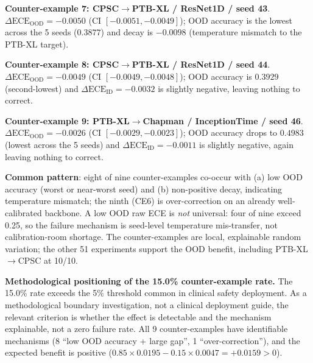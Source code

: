 \documentclass[review,12pt,nonatbib]{elsarticle}
\begin{document}
\textbf{Counter-example 7: CPSC$\rightarrow$PTB-XL / ResNet1D / seed 43}.
$\Delta\text{ECE}_{\text{OOD}}=-0.0050$ (CI $[-0.0051, -0.0049]$); OOD
accuracy is the lowest across the 5 seeds ($0.3877$) and decay is
$-0.0098$ (temperature mismatch to the PTB-XL target).

\textbf{Counter-example 8: CPSC$\rightarrow$PTB-XL / ResNet1D / seed 44}.
$\Delta\text{ECE}_{\text{OOD}}=-0.0049$ (CI $[-0.0049, -0.0048]$); OOD
accuracy is $0.3929$ (second-lowest) and
$\Delta\text{ECE}_{\text{ID}}=-0.0032$ is slightly negative, leaving
nothing to correct.

\textbf{Counter-example 9: PTB-XL$\rightarrow$Chapman / InceptionTime / seed 46}.
$\Delta\text{ECE}_{\text{OOD}}=-0.0026$ (CI $[-0.0029, -0.0023]$); OOD
accuracy drops to $0.4983$ (lowest across the 5 seeds) and
$\Delta\text{ECE}_{\text{ID}}=-0.0011$ is slightly negative, again leaving
nothing to correct.

\textbf{Common pattern}: eight of nine counter-examples co-occur with
(a) low OOD accuracy (worst or near-worst seed) and (b) non-positive
decay, indicating temperature mismatch; the ninth (CE6) is over-correction
on an already well-calibrated backbone. A low OOD raw ECE is \emph{not}
universal: four of nine exceed 0.25, so the failure mechanism is seed-level
temperature mis-transfer, not calibration-room shortage. The
counter-examples are local, explainable random variation; the other 51
experiments support the OOD benefit, including PTB-XL$\rightarrow$CPSC at
10/10.

\textbf{Methodological positioning of the 15.0\% counter-example rate.}
The 15.0\% rate exceeds the 5\% threshold common in clinical safety
deployment. As a methodological boundary investigation, not a clinical
deployment guide, the relevant criterion is whether the effect is
detectable and the mechanism explainable, not a zero failure rate. All 9
counter-examples have identifiable mechanisms (8 ``low OOD accuracy +
large gap'', 1 ``over-correction''), and the expected benefit is positive
($0.85 \times 0.0195 - 0.15 \times 0.0047 = +0.0159 > 0$).

\end{document}
